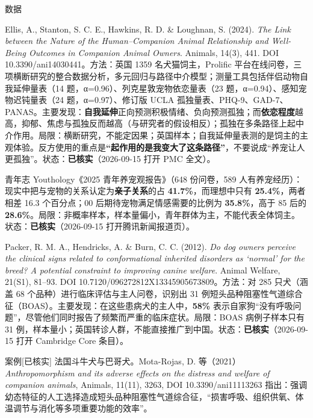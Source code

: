 \documentclass[prep,both]{debate}
\begin{document}
\begin{fields}
\begin{evidence}{数据}
\end{evidence}
\begin{bullets}
\item Ellis, A., Stanton, S. C. E., Hawkins, R. D. \& Loughnan, S. (2024). \emph{The Link between the Nature of the Human–Companion Animal Relationship and Well-Being Outcomes in Companion Animal Owners}. Animals, 14(3), 441. DOI 10.3390/ani14030441。方法：英国 1359 名犬猫饲主，Prolific 平台在线问卷，三项横断研究的整合数据分析，多元回归与路径中介模型；测量工具包括伴侣动物自我延伸量表（14 题，α=0.96）、列克星敦宠物依恋量表（23 题，α=0.94）、感知宠物迟钝量表（24 题，α=0.97）、修订版 UCLA 孤独量表、PHQ-9、GAD-7、PANAS。主要发现：\textbf{自我延伸}正向预测积极情绪、负向预测孤独；而\textbf{依恋程度}越高，抑郁、焦虑与孤独反而越高（与研究者的假设相反）；孤独在多条路径上起中介作用。局限：横断研究，不能定因果；英国样本；自我延伸量表测的是饲主的主观体验。反方使用的重点是\textbf{“起作用的是我变大了这条路径”}，不要说成“养宠让人更孤独”。状态：\textbf{已核实}（2026-09-15 打开 PMC 全文）。
\item 青年志 Youthology《2025 青年养宠观报告》（648 份问卷，589 人有养宠经历）：现实中把与宠物的关系认定为\textbf{亲子关系}的占 \textbf{41.7\%}，而理想中只有 \textbf{25.4\%}，两者相差 16.3 个百分点；00 后期待宠物满足情感需要的比例为 \textbf{35.8\%}，高于 85 后的 \textbf{28.6\%}。局限：非概率样本，样本量偏小，青年群体为主，不能代表全体饲主。状态：\textbf{已核实}（2026-09-15 打开腾讯新闻报道页）。
\item Packer, R. M. A., Hendricks, A. \& Burn, C. C. (2012). \emph{Do dog owners perceive the clinical signs related to conformational inherited disorders as ‘normal’ for the breed? A potential constraint to improving canine welfare}. Animal Welfare, 21(S1), 81–93. DOI 10.7120/096272812X13345905673809。方法：对 285 只犬（涵盖 68 个品种）进行临床评估与主人问卷，识别出 31 例短头品种阻塞性气道综合征（BOAS）。主要发现：在这些患病犬的主人中，\textbf{58\%} 表示自家狗“没有呼吸问题”，尽管他们同时报告了频繁而严重的临床症状。局限：BOAS 病例子样本只有 31 例，样本量小；英国转诊人群，不能直接推广到中国。状态：\textbf{已核实}（2026-09-15 打开 Cambridge Core 条目）。
\end{bullets}
\begin{evidence}{案例}[已核实]
法国斗牛犬与巴哥犬。Mota-Rojas, D. 等（2021）\emph{Anthropomorphism and its adverse effects on the distress and welfare of companion animals}, Animals, 11(11), 3263, DOI 10.3390/ani11113263 指出：强调幼态特征的人工选择造成短头品种阻塞性气道综合征，“损害呼吸、组织供氧、体温调节与消化等多项重要功能的效率”。

\end{evidence}
\end{fields}
\end{document}
